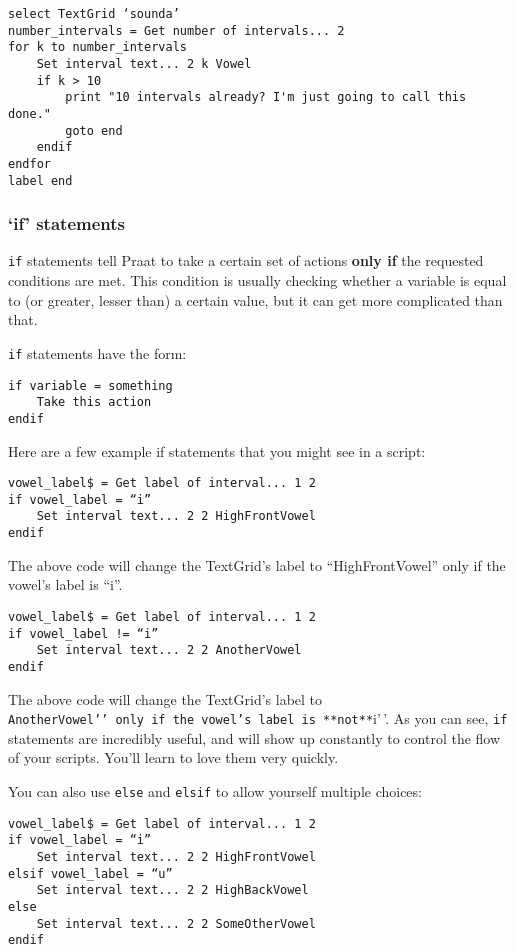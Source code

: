 \begin{verbatim} 
select TextGrid ‘sounda’
number_intervals = Get number of intervals... 2
for k to number_intervals
    Set interval text... 2 k Vowel
    if k > 10
        print "10 intervals already? I'm just going to call this done."
        goto end
    endif
endfor
label end
\end{verbatim}

\hypertarget{if-statements}{%
\subsubsection{`if' statements}\label{if-statements}}

\texttt{if} statements tell Praat to take a certain set of actions
\textbf{only if} the requested conditions are met. This condition is
usually checking whether a variable is equal to (or greater, lesser
than) a certain value, but it can get more complicated than that.

\texttt{if} statements have the form:

\begin{verbatim}
if variable = something
    Take this action
endif
\end{verbatim}

Here are a few example if statements that you might see in a script:

\begin{verbatim} 
vowel_label$ = Get label of interval... 1 2
if vowel_label = “i”
    Set interval text... 2 2 HighFrontVowel
endif
\end{verbatim}

The above code will change the TextGrid's label to ``HighFrontVowel''
only if the vowel's label is ``i''.

\begin{verbatim}
vowel_label$ = Get label of interval... 1 2
if vowel_label != “i”
    Set interval text... 2 2 AnotherVowel
endif
\end{verbatim}

The above code will change the TextGrid's label to
\texttt{AnotherVowel’’\ only\ if\ the\ vowel’s\ label\ is\ **not**}i'\,'.
As you can see, \texttt{if} statements are incredibly useful, and will
show up constantly to control the flow of your scripts. You'll learn to
love them very quickly.

You can also use \texttt{else} and \texttt{elsif} to allow yourself
multiple choices:

\begin{verbatim}
vowel_label$ = Get label of interval... 1 2
if vowel_label = “i”
    Set interval text... 2 2 HighFrontVowel
elsif vowel_label = “u”
    Set interval text... 2 2 HighBackVowel
else
    Set interval text... 2 2 SomeOtherVowel
endif
\end{verbatim}


